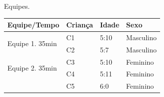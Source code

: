\begin{quadro}[!h]
    \caption{Equipes.}
    \label{quadro:equipes}
    \centering
    {
        \begin{footnotesize}
        {\renewcommand{\arraystretch}{1.2}
        \begin{tabular}{|l|l|l|l|} 
            \hline
            \textbf{ Equipe/Tempo }                                  & \textbf{Criança } & \textbf{Idade} & \textbf{Sexo} \\ 
            \hline
            
            \multirow{2}{*}{Equipe 1. 35min}                & C1               & 5:10                         & Masculino \\ 
            \cline{2-4}
                                                                                        & C2               & 5:7                          & Masculino \\ 
            \hline
            \multirow{2}{*}{Equipe 2. 35min}                & C3               & 5:10                         &  Feminino \\ 
            \cline{2-4}
            \multicolumn{1}{|c|}{}                                      & C4               & 5:11                         &  Feminino \\ 
            \cline{2-4}
            \multicolumn{1}{|c|}{}                                      & C5               & 6:0                          & Feminino \\ 
            \hline
            

\end{tabular}}
\end{footnotesize}}
\end{quadro}
